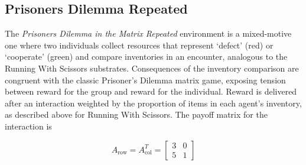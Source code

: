 \documentclass{article} %
\begin{document}
\subsection{Prisoners Dilemma Repeated}
The \textit{Prisoners Dilemma in the Matrix Repeated} environment is a mixed-motive one where two individuals collect resources that represent
‘defect’ (red) or ‘cooperate’ (green) and compare
inventories in an encounter, analogous to the Running With Scissors substrates. Consequences of the
inventory comparison are congruent with the classic Prisoner’s Dilemma matrix game, exposing tension between reward for the group and reward for the individual. Reward is delivered after an interaction weighted by the proportion of items in each agent's inventory, as described above for Running With Scissors. The payoff matrix for the
interaction is

\[
A_{\text{row}} = A_{\text{col}}^T = 
\begin{bmatrix}
3 & 0 \\
5 & 1 
\end{bmatrix}
\]
\end{document}
